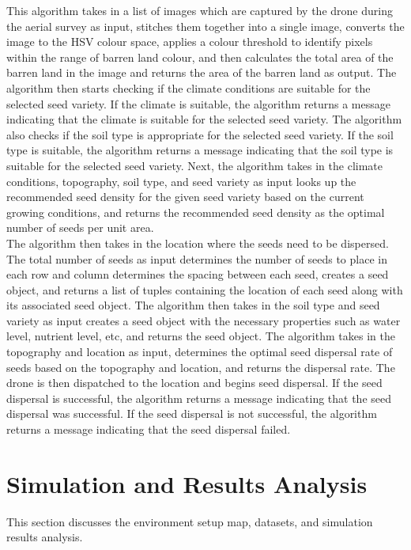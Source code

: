 \documentclass[conference]{IEEEtran}
\begin{document}
 This algorithm takes in a list of images which are captured by the drone during the aerial survey as input, stitches them together into a single image, converts the image to the HSV colour space, applies a colour threshold to identify pixels within the range of barren land colour, and then calculates the total area of the barren land in the image and returns the area of the barren land as output. The algorithm then starts checking if the climate conditions are suitable for the selected seed variety. If the climate is suitable, the algorithm returns a message indicating that the climate is suitable for the selected seed variety. The algorithm also checks if the soil type is appropriate for the selected seed variety. If the soil type is suitable, the algorithm returns a message indicating that the soil type is suitable for the selected seed variety. Next, the algorithm takes in the climate conditions, topography, soil type, and seed variety as input looks up the recommended seed density for the given seed variety based on the current growing conditions, and returns the recommended seed density as the optimal number of seeds per unit area. 
\\The algorithm then takes in the location where the seeds need to be dispersed. The total number of seeds as input determines the number of seeds to place in each row and column determines the spacing between each seed, creates a seed object, and returns a list of tuples containing the location of each seed along with its associated seed object. The algorithm then takes in the soil type and seed variety as input creates a seed object with the necessary properties such as water level, nutrient level, etc, and returns the seed object. The algorithm takes in the topography and location as input, determines the optimal seed dispersal rate of seeds based on the topography and location, and returns the dispersal rate. The drone is then dispatched to the location and begins seed dispersal. If the seed dispersal is successful, the algorithm returns a message indicating that the seed dispersal was successful. If the seed dispersal is not successful, the algorithm returns a message indicating that the seed dispersal failed.

\section{Simulation and Results Analysis}
This section discusses the environment setup map, datasets, and simulation results analysis.
\end{document}
